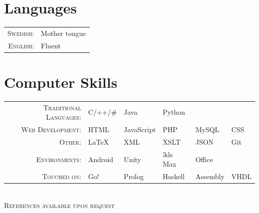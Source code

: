 \documentclass[a4paper,10pt]{article}
\begin{document}
\section{Languages}
\begin{tabular}{Dl}
 \textsc{Swedish:}&Mother tongue\\
\textsc{English:}&Fluent\\
\end{tabular}

\section{Computer Skills}
\def\arraystretch{1.2}%
\begin{tabu}to \textwidth{r X[c] X[c] X[c] X[c] X[c]}
\textsc{Traditional Languages:}		&	C/++/\#	&	 Java		&	Python	&			&		\\
\textsc{Web Development:}		&	 HTML		& 	JavaScript	&	PHP		&	MySQL	& 	CSS	\\
\textsc{Other:}				& 	LaTeX		&	XML		&	XSLT		&	JSON		&	 Git	\\
\textsc{Environments:}			&	Android	& 	Unity		&	3ds Max	&	Office		&		\\
\textsc{Touched on: }			&	Go!		&	 Prolog	&	Haskell	&	Assembly	&	 VHDL
\end{tabu}
\\[0.3cm]

\centering\textsc{ References available upon request}
\end{document}

